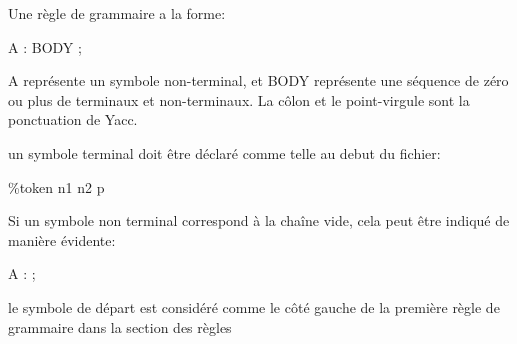 \documentclass[10pt]{report}
\begin{document}
Une règle de grammaire a la forme:

A  :  BODY  ;

A représente un symbole non-terminal, et BODY représente une séquence de zéro ou plus de terminaux et non-terminaux. La côlon et le point-virgule sont la ponctuation de Yacc.

un symbole terminal doit être déclaré comme telle au debut du fichier:

\%token  n1  n2  p

Si un symbole non terminal correspond à la chaîne vide, cela peut être indiqué de manière évidente:

A : ;

le symbole de départ est considéré comme le côté gauche de la première règle de grammaire dans la section des règles
\end{document}
